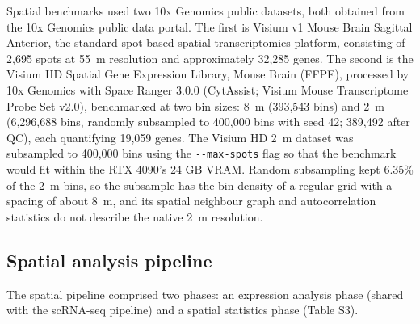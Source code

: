 \documentclass[runningheads]{llncs}
\begin{document}
Spatial benchmarks used two 10x Genomics public datasets, both obtained from the 10x Genomics public data portal. The first is Visium v1 Mouse Brain Sagittal Anterior, the standard spot-based spatial transcriptomics platform, consisting of 2,695 spots at 55~\textmu{}m resolution and approximately 32,285 genes. The second is the Visium HD Spatial Gene Expression Library, Mouse Brain (FFPE), processed by 10x Genomics with Space Ranger 3.0.0 (CytAssist; Visium Mouse Transcriptome Probe Set v2.0), benchmarked at two bin sizes: 8~\textmu{}m (393,543 bins) and 2~\textmu{}m (6,296,688 bins, randomly subsampled to 400,000 bins with seed 42; 389,492 after QC), each quantifying 19,059 genes. The Visium HD 2~\textmu{}m dataset was subsampled to 400,000 bins using the \texttt{-\/-max-spots} flag so that the benchmark would fit within the RTX 4090's 24 GB VRAM. Random subsampling kept 6.35\% of the 2~\textmu{}m bins, so the subsample has the bin density of a regular grid with a spacing of about 8~\textmu{}m, and its spatial neighbour graph and autocorrelation statistics do not describe the native 2~\textmu{}m resolution.

\hypertarget{spatial-analysis-pipeline}{%
\subsection{Spatial analysis pipeline}\label{spatial-analysis-pipeline}}

The spatial pipeline comprised two phases: an expression analysis phase (shared with the scRNA-seq pipeline) and a spatial statistics phase (Table S3).
\end{document}
